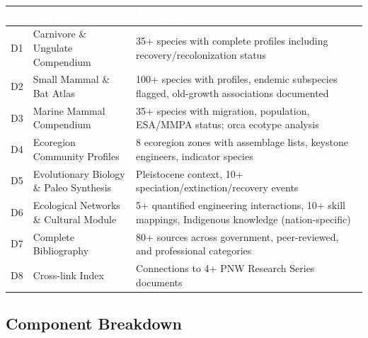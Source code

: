 \documentclass[11pt,letterpaper]{article}
\newcommand{\tableheader}[1]{\textbf{\sffamily\textcolor{white}{#1}}}
\begin{document}
\begin{center}
\begin{tabularx}{\textwidth}{C{0.5cm}L{4cm}X}
\toprule
{}
\tableheader{\#} & \tableheader{Deliverable} & \tableheader{Acceptance Criteria} \\
\midrule
D1 & Carnivore \& Ungulate Compendium & 35+ species with complete profiles including recovery/recolonization status \\
D2 & Small Mammal \& Bat Atlas & 100+ species with profiles, endemic subspecies flagged, old-growth associations documented \\
D3 & Marine Mammal Compendium & 35+ species with migration, population, ESA/MMPA status; orca ecotype analysis \\
D4 & Ecoregion Community Profiles & 8 ecoregion zones with assemblage lists, keystone engineers, indicator species \\
D5 & Evolutionary Biology \& Paleo Synthesis & Pleistocene context, 10+ speciation/extinction/recovery events \\
D6 & Ecological Networks \& Cultural Module & 5+ quantified engineering interactions, 10+ skill mappings, Indigenous knowledge (nation-specific) \\
D7 & Complete Bibliography & 80+ sources across government, peer-reviewed, and professional categories \\
D8 & Cross-link Index & Connections to 4+ PNW Research Series documents \\
\bottomrule
\end{tabularx}
\end{center}

\subsection{Component Breakdown}
\end{document}

